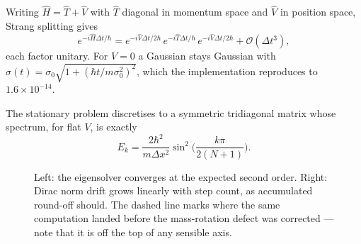 \documentclass[11pt,a4paper]{article}
\theoremstyle{plain}
\theoremstyle{definition}
\begin{document}
Writing $\hat H=\hat T+\hat V$ with $\hat T$ diagonal in momentum space and
$\hat V$ in position space, Strang splitting gives
\begin{equation}
e^{-i\hat H\Delta t/\hbar}
= e^{-i\hat V\Delta t/2\hbar}\,e^{-i\hat T\Delta t/\hbar}\,e^{-i\hat V\Delta t/2\hbar}
+ \mathcal O(\Delta t^3),
\end{equation}
each factor unitary. For $V=0$ a Gaussian stays Gaussian with
$\sigma(t)=\sigma_0\sqrt{1+(\hbar t/m\sigma_0^2)^2}$, which the implementation
reproduces to $1.6\times10^{-14}$.

The stationary problem discretises to a symmetric tridiagonal matrix whose
spectrum, for flat $V$, is exactly
\begin{equation}
E_k=\frac{2\hbar^2}{m\Delta x^2}\sin^2\!\Big(\frac{k\pi}{2(N+1)}\Big).
\end{equation}

\begin{figure}[h]
\centering
{}
\hfill
{}
\caption{Left: the eigensolver converges at the expected second order. Right:
Dirac norm drift grows linearly with step count, as accumulated round-off
should. The dashed line marks where the same computation landed before the
mass-rotation defect was corrected --- note that it is off the top of any
sensible axis.}
\label{fig:convergence}
\end{figure}
\end{document}
